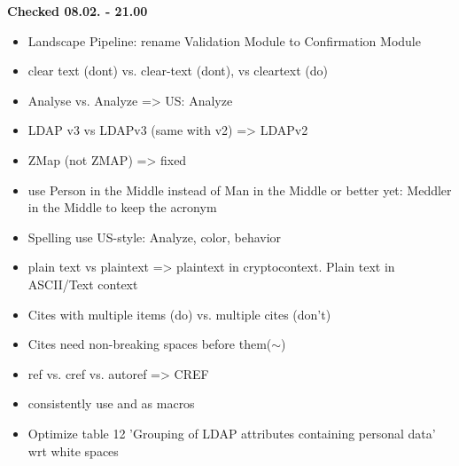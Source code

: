\textbf{Checked 08.02. - 21.00}
\begin{itemize}
    \item Landscape Pipeline: rename Validation Module to Confirmation Module

    \item clear text (dont) vs. clear-text (dont), vs cleartext (do)
    \item Analyse vs. Analyze => US: Analyze
    \item LDAP v3 vs LDAPv3 (same with v2) => LDAPv2
    \item ZMap (not ZMAP) => fixed
    \item use Person in the Middle instead of Man in the Middle or better yet: Meddler in the Middle to keep the acronym
    \item Spelling use US-style: Analyze, color, behavior
    \item plain text vs plaintext => plaintext in cryptocontext. Plain text in ASCII/Text context
    \item Cites with multiple items (do) vs. multiple cites (don't)
    \item Cites need non-breaking spaces before them($\sim$) %
    \item ref vs. cref vs. autoref  => CREF
    \item consistently use \eg and \etal as macros
    \item Optimize table 12 'Grouping of LDAP attributes containing personal data' wrt white spaces
\end{itemize}


\vfill
\pagebreak
\twocolumn